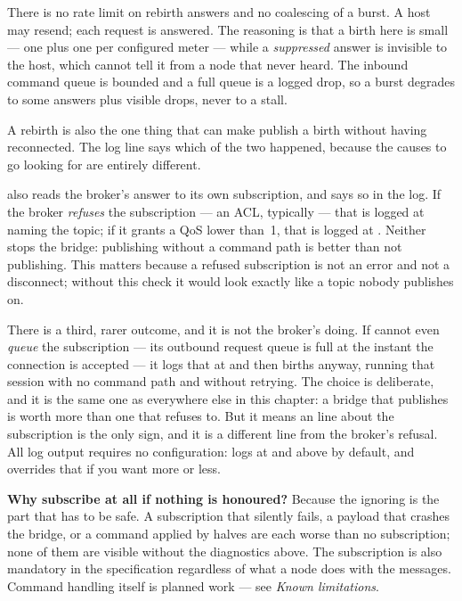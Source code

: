 \begin{note}
There is no rate limit on rebirth answers and no coalescing of a burst. A host may resend;
each request is answered. The reasoning is that a birth here is small --- one 
plus one  per configured meter --- while a \emph{suppressed} answer is
invisible to the host, which cannot tell it from a node that never heard. The inbound
command queue is bounded and a full queue is a logged drop, so a burst degrades to some
answers plus visible drops, never to a stall.
\end{note}

A rebirth is also the one thing that can make \prog publish a birth without having
reconnected. The log line says which of the two happened, because the causes to go looking
for are entirely different.

\prog also reads the broker's answer to its own subscription, and says so in the log. If
the broker \emph{refuses} the subscription --- an ACL, typically --- that is logged at
 naming the topic; if it grants a QoS lower than~1, that is logged at
. Neither stops the bridge: publishing without a command path is better than
not publishing. This matters because a refused subscription is not an error and not a
disconnect; without this check it would look exactly like a topic nobody publishes on.

There is a third, rarer outcome, and it is not the broker's doing. If \prog cannot even
\emph{queue} the subscription --- its outbound request queue is full at the instant the
connection is accepted --- it logs that at  and then births anyway, running that
session with no command path and without retrying. The choice is deliberate, and it is the
same one as everywhere else in this chapter: a bridge that publishes is worth more than one
that refuses to. But it means an  line about the subscription is the only sign,
and it is a different line from the broker's refusal. All log output requires no
configuration: \prog logs at  and above by default, and 
overrides that if you want more or less.

\begin{note}
\textbf{Why subscribe at all if nothing is honoured?} Because the ignoring is the part that
has to be safe. A subscription that silently fails, a payload that crashes the bridge, or a
command applied by halves are each worse than no subscription; none of them are visible
without the diagnostics above. The subscription is also mandatory in the specification
regardless of what a node does with the messages. Command handling itself is planned
work --- see \emph{Known limitations}.
\end{note}

